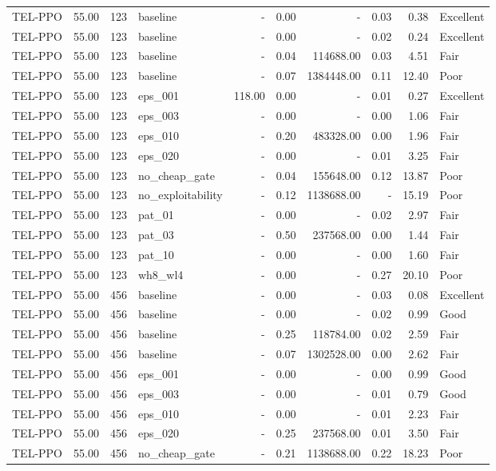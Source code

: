 \begin{table}[htbp]
\begin{tabular}{lrrlrrrrrl}
TEL-PPO & 55.00 & 123 & baseline & - & 0.00 & - & 0.03 & 0.38 & Excellent \\
TEL-PPO & 55.00 & 123 & baseline & - & 0.00 & - & 0.02 & 0.24 & Excellent \\
TEL-PPO & 55.00 & 123 & baseline & - & 0.04 & 114688.00 & 0.03 & 4.51 & Fair \\
TEL-PPO & 55.00 & 123 & baseline & - & 0.07 & 1384448.00 & 0.11 & 12.40 & Poor \\
TEL-PPO & 55.00 & 123 & eps_001 & 118.00 & 0.00 & - & 0.01 & 0.27 & Excellent \\
TEL-PPO & 55.00 & 123 & eps_003 & - & 0.00 & - & 0.00 & 1.06 & Fair \\
TEL-PPO & 55.00 & 123 & eps_010 & - & 0.20 & 483328.00 & 0.00 & 1.96 & Fair \\
TEL-PPO & 55.00 & 123 & eps_020 & - & 0.00 & - & 0.01 & 3.25 & Fair \\
TEL-PPO & 55.00 & 123 & no_cheap_gate & - & 0.04 & 155648.00 & 0.12 & 13.87 & Poor \\
TEL-PPO & 55.00 & 123 & no_exploitability & - & 0.12 & 1138688.00 & - & 15.19 & Poor \\
TEL-PPO & 55.00 & 123 & pat_01 & - & 0.00 & - & 0.02 & 2.97 & Fair \\
TEL-PPO & 55.00 & 123 & pat_03 & - & 0.50 & 237568.00 & 0.00 & 1.44 & Fair \\
TEL-PPO & 55.00 & 123 & pat_10 & - & 0.00 & - & 0.00 & 1.60 & Fair \\
TEL-PPO & 55.00 & 123 & wh8_wl4 & - & 0.00 & - & 0.27 & 20.10 & Poor \\
TEL-PPO & 55.00 & 456 & baseline & - & 0.00 & - & 0.03 & 0.08 & Excellent \\
TEL-PPO & 55.00 & 456 & baseline & - & 0.00 & - & 0.02 & 0.99 & Good \\
TEL-PPO & 55.00 & 456 & baseline & - & 0.25 & 118784.00 & 0.02 & 2.59 & Fair \\
TEL-PPO & 55.00 & 456 & baseline & - & 0.07 & 1302528.00 & 0.00 & 2.62 & Fair \\
TEL-PPO & 55.00 & 456 & eps_001 & - & 0.00 & - & 0.00 & 0.99 & Good \\
TEL-PPO & 55.00 & 456 & eps_003 & - & 0.00 & - & 0.01 & 0.79 & Good \\
TEL-PPO & 55.00 & 456 & eps_010 & - & 0.00 & - & 0.01 & 2.23 & Fair \\
TEL-PPO & 55.00 & 456 & eps_020 & - & 0.25 & 237568.00 & 0.01 & 3.50 & Fair \\
TEL-PPO & 55.00 & 456 & no_cheap_gate & - & 0.21 & 1138688.00 & 0.22 & 18.23 & Poor \\

\end{tabular}
\end{table}
